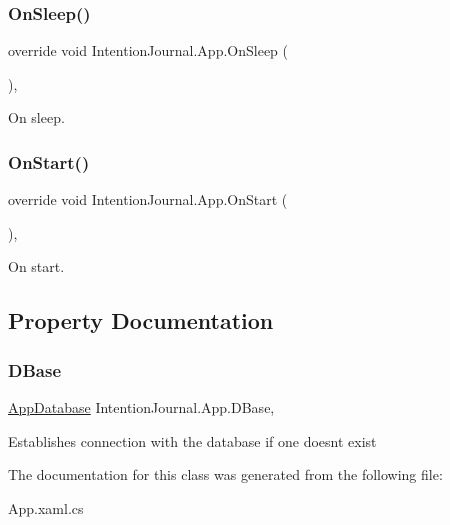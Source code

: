 \subsubsection{\texorpdfstring{On\+Sleep()}{OnSleep()}}
{\footnotesize\ttfamily override void Intention\+Journal.\+App.\+On\+Sleep (\begin{DoxyParamCaption}{ }\end{DoxyParamCaption})\hspace{0.3cm}{\ttfamily [inline]}, {\ttfamily [protected]}}



On sleep. 

\mbox{\label{class_intention_journal_1_1_app_a773d1220e09f08c939dd778f5b72cb59}} 
\subsubsection{\texorpdfstring{On\+Start()}{OnStart()}}
{\footnotesize\ttfamily override void Intention\+Journal.\+App.\+On\+Start (\begin{DoxyParamCaption}{ }\end{DoxyParamCaption})\hspace{0.3cm}{\ttfamily [inline]}, {\ttfamily [protected]}}



On start. 



\subsection{Property Documentation}
\mbox{\label{class_intention_journal_1_1_app_aea811782113fffd3d180aa9f62ab1acc}} 
\subsubsection{\texorpdfstring{D\+Base}{DBase}}
{\footnotesize\ttfamily \hyperlink{class_intention_journal_1_1_app_database}{App\+Database} Intention\+Journal.\+App.\+D\+Base\hspace{0.3cm}{\ttfamily [static]}, {\ttfamily [get]}}



Establishes connection with the database if one doesn\textquotesingle{}t exist 



The documentation for this class was generated from the following file\+:\begin{DoxyCompactItemize}
\item 
App.\+xaml.\+cs\end{DoxyCompactItemize}
